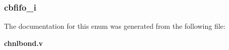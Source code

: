 \subsubsection[{rawdata\-\_\-vld\-\_\-rising}]{ {\bfseries \textcolor{vhdlchar}{ }} \hspace{0.3cm}}\label{enum1chnlbond_af093ad8e216525069812776edd4bb90c}
\subsubsection[{ra\-\_\-en}]{ {\bfseries \textcolor{vhdlchar}{ }} \hspace{0.3cm}}\label{enum1chnlbond_a3ca5d862110d70ace1ecdacbcd204f3e}
\subsubsection[{D\-R\-A\-M16\-X\-N}]{ {\bfseries \textcolor{vhdlchar}{cbfifo\-\_\-i}\textcolor{vhdlchar}{ }} \hspace{0.3cm}}\label{enum1chnlbond_a16e02f8532f6d126886913d58fe7eb54}


The documentation for this enum was generated from the following file\-:\begin{DoxyCompactItemize}
\item 
{\bf chnlbond.\-v}\end{DoxyCompactItemize}
